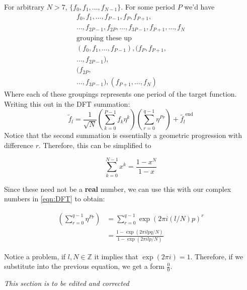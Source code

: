 \documentclass[reprint, amsmath,amssymb, aps]{revtex4-2}
\begin{document}
                For arbitrary $N>7$, $\{f_0, f_1, \dots, f_{N-1}\}$. For some period $P$ we'd have
                \begin{gather*}
                    f_0 , f_1 , \dots , f_{P-1}, f_{P}, f_{P+1}, \\
                    \dots, f_{2P - 1}, f_{2P}, \dots, f_{3P-1}, f_{P+1}, \dots, f_{N} \\
                    \text{grouping these up} \\
                    (f_0 , f_1 , \dots , f_{P-1}), (f_{P}, f_{P+1}, \\
                    \dots, f_{2P - 1}), \\
                    (f_{2P}, \\\dots, f_{3P-1}), (f_{P+1}, \dots, f_{N})
                \end{gather*}
                Where each of these groupings represents one period of the target function. Writing this out in the DFT summation:
                \begin{equation} \label{eqn:DFT}
                \tilde{f}_l = \frac{1}{\sqrt{N}} \left(\sum_{k=0}^{P-1}f_k \eta^k\right)\left(\sum_{r=0}^{q-1}\eta^{Pr}\right) + \tilde{f_l}^{\text{end}} 
                \end{equation}
                Notice that the second summation is essentially a geometric progression with difference $r$. Therefore, this can be simplified to

                \begin{equation*}
                    \sum_{k=0}^{N-1} x^k = \frac{1-x^N}{1-x}
                \end{equation*}

                Since these need not be a \textbf{real} number, we can use this with our complex numbers in \eqref{eqn:DFT} to obtain:

                \begin{align*}
                \left(\sum_{r=0}^{q-1}\eta^{Pr}\right) &= \sum_{r=0}^{q-1}\exp(2\pi i (l/N)p)^r \\
                &= \frac{1-\exp(2 \pi i l p q / N)}{1 - \exp(2 \pi i l p / N)}
                \end{align*}

                Notice a problem, if $l,N\in \mathbb{Z}$ it implies that $\exp(2\pi i) = 1$. Therefore, if we substitute into the previous equation, we get a form $\frac{0}{0}$.

                \begin{mdframed}
                    \textit{This section is to be edited and corrected}
                \end{mdframed}
\end{document}
